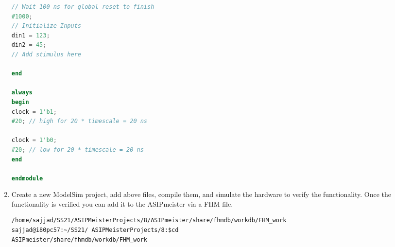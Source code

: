 \begin{enumerate}[resume]
\begin{lstlisting}[language=verilog,caption={"testbench.v"},captionpos=t]
// Wait 100 ns for global reset to finish
#1000;
// Initialize Inputs
din1 = 123;
din2 = 45;       
// Add stimulus here

end

always 
begin
clock = 1'b1; 
#20; // high for 20 * timescale = 20 ns

clock = 1'b0;
#20; // low for 20 * timescale = 20 ns
end

endmodule
\end{lstlisting}	
\item Create a new ModelSim project, add above files, compile them, and simulate the hardware to verify the functionality. Once the functionality is verified you can add it to the ASIPmeister via a FHM file.
\begin{lstlisting}
/home/sajjad/SS21/ASIPMeisterProjects/8/ASIPmeister/share/fhmdb/workdb/FHM_work
sajjad@i80pc57:~/SS21/ ASIPMeisterProjects/8:$cd
ASIPmeister/share/fhmdb/workdb/FHM_work
\end{lstlisting}
\end{enumerate}
